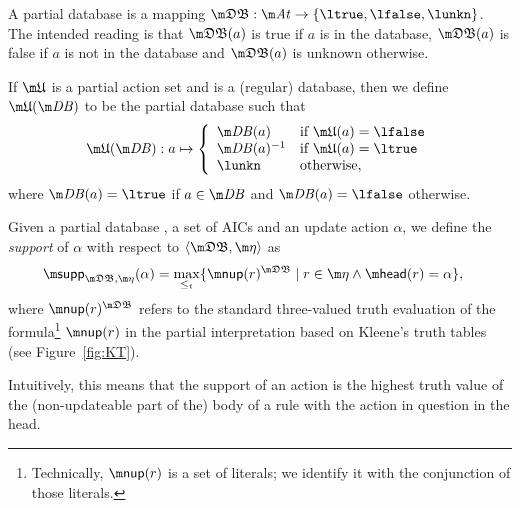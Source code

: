A partial database is a mapping $\tdb: \atoms \to \{\ltrue,\lfalse,\lunkn\}$.
The intended reading is that $\tdb(a)$ is true if $a$ is in the database, $\tdb(a)$ is false if $a$ is not in the database and $\tdb(a)$ is unknown otherwise. 

If $\UUU$ is a partial action set and \db is a (regular) database, then we define $\UUU(\db)$ to be the partial database such that 
\[ \UUU(\db): a \mapsto \left \{\begin{array}{ll}
                                 \db(a) & \text{if }\UUU(a) = \lfalse\\
                                 \db(a)^{-1} & \text{if }\UUU(a) = \ltrue\\
                                 \lunkn & \text{otherwise,}
                                \end{array}\right.
                                \]
where $\db(a) = \ltrue$ if $a\in \db$ and $\db(a)=\lfalse$ otherwise. 



\begin{definition}\label{def:support}
Given a partial database \tdb, a set of AICs \aics and an update action $\alpha$,  we define the \emph{support} of $\alpha$ with respect to $\langle \tdb, \aics\rangle$ as 
\begin{align*}
 \supp_{\tdb,\aics}(\alpha) &= \max_{\leq_t}\{\nup(r)^{\tdb}\mid r\in \aics \land \head(r) = \alpha\},
\end{align*}
where $\nup(r)^{\tdb}$ refers to the standard three-valued truth evaluation of the formula\footnote{Technically, $\nup(r)$ is a set of literals; we identify it with the conjunction of those literals.} $\nup(r)$ in the partial interpretation \tdb based on Kleene's truth tables \cite{Kleene38} (see Figure~\ref{fig:KT}).
\end{definition}
Intuitively, this means that the support of an action is the highest truth value of the (non-updateable part of the) body of a rule with the action in question in the head. 



